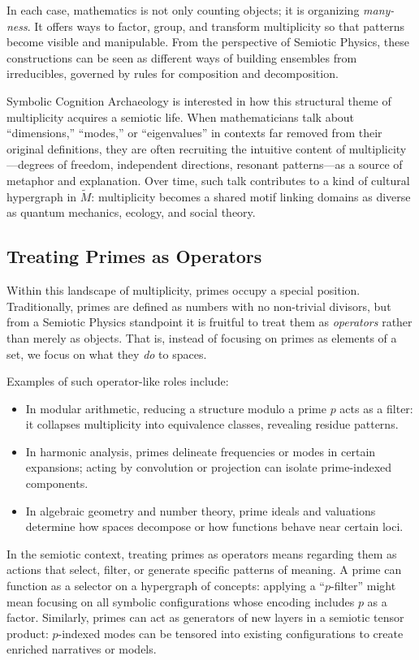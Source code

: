 \documentclass[12]{amsart}
\theoremstyle{plain}
\begin{document}
In each case, mathematics is not only counting objects; it is organizing \emph{many-ness}. It offers ways to factor, group, and transform multiplicity so that patterns become visible and manipulable. From the perspective of Semiotic Physics, these constructions can be seen as different ways of building ensembles from irreducibles, governed by rules for composition and decomposition.

Symbolic Cognition Archaeology is interested in how this structural theme of multiplicity acquires a semiotic life. When mathematicians talk about ``dimensions,'' ``modes,'' or ``eigenvalues'' in contexts far removed from their original definitions, they are often recruiting the intuitive content of multiplicity—degrees of freedom, independent directions, resonant patterns—as a source of metaphor and explanation. Over time, such talk contributes to a kind of cultural hypergraph in $\tilde M$: multiplicity becomes a shared motif linking domains as diverse as quantum mechanics, ecology, and social theory.

\subsection{Treating Primes as Operators}

Within this landscape of multiplicity, primes occupy a special position. Traditionally, primes are defined as numbers with no non-trivial divisors, but from a Semiotic Physics standpoint it is fruitful to treat them as \emph{operators} rather than merely as objects. That is, instead of focusing on primes as elements of a set, we focus on what they \emph{do} to spaces.

Examples of such operator-like roles include:

\begin{itemize}
  \item In modular arithmetic, reducing a structure modulo a prime $p$ acts as a filter: it collapses multiplicity into equivalence classes, revealing residue patterns.
  \item In harmonic analysis, primes delineate frequencies or modes in certain expansions; acting by convolution or projection can isolate prime-indexed components.
  \item In algebraic geometry and number theory, prime ideals and valuations determine how spaces decompose or how functions behave near certain loci.
\end{itemize}

In the semiotic context, treating primes as operators means regarding them as actions that select, filter, or generate specific patterns of meaning. A prime can function as a selector on a hypergraph of concepts: applying a ``$p$-filter'' might mean focusing on all symbolic configurations whose encoding includes $p$ as a factor. Similarly, primes can act as generators of new layers in a semiotic tensor product: $p$-indexed modes can be tensored into existing configurations to create enriched narratives or models.
\end{document}

